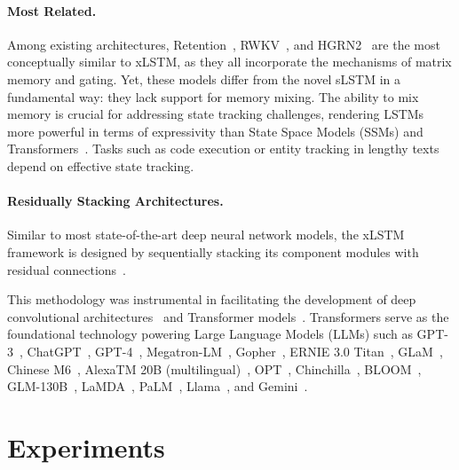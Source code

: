 \paragraph{Most Related.} Among existing architectures, Retention~\citep{Sun:23arxiv}, RWKV~\citep{Peng:23arxivshort,Peng:24arxivshort}, and HGRN2~\citep{Qin:24arxiv} are the most conceptually similar to xLSTM, as they all incorporate the mechanisms of matrix memory and gating. Yet, these models differ from the novel sLSTM in a fundamental way: they lack support for memory mixing. The ability to mix memory is crucial for addressing state tracking challenges, rendering LSTMs more powerful in terms of expressivity than State Space Models (SSMs) and Transformers~\citep{Merrill:24,Deletang:23}. Tasks such as code execution or entity tracking in lengthy texts depend on effective state tracking.

\paragraph{Residually Stacking Architectures.} Similar to most state-of-the-art deep neural network models, the xLSTM framework is designed by sequentially stacking its component modules with residual connections~\citep{Srivastava:15,He:16}.

This methodology was instrumental in facilitating the development of deep convolutional architectures~\citep{He:16} and Transformer models~\citep{Vaswani:17}. Transformers serve as the foundational technology powering Large Language Models (LLMs) such as GPT-3~\citep{Brown:20short}, ChatGPT~\citep{Schulman:22short}, GPT-4~\citep{Achiam:23gpt4short}, Megatron-LM~\citep{Shoeybi:19}, Gopher~\citep{Rae:21short}, ERNIE 3.0 Titan~\citep{Wang:21arxivshort}, GLaM~\citep{Du:21glamshort}, Chinese M6~\citep{Lin:21}, AlexaTM 20B (multilingual)~\citep{Soltan:22}, OPT~\citep{Zhang:22opt}, Chinchilla~\citep{Hoffmann:22short}, BLOOM~\citep{Scao:22arxivshort}, GLM-130B~\citep{Zeng:22arxivshort}, LaMDA~\citep{Thoppilan:22short}, PaLM~\citep{Chowdhery:22short}, Llama~\citep{Touvron:23arxiv}, and Gemini~\citep{GeminiTeam:23arxiv,Reid:24arxiv}.

\section{Experiments}
\label{sec:Exp}

